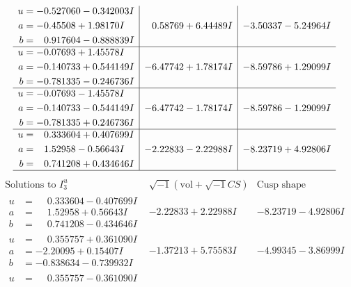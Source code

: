 \documentclass[1p]{elsarticle_modified}
\theoremstyle{definition}
\newcommand{\I}{\sqrt{-1}}
\begin{document}
$$\begin{array}{c|c|c}
\begin{aligned}
u &= -0.527060 - 0.342003 I \\
a &= -0.45508 + 1.98170 I \\
b &= \phantom{-}0.917604 - 0.888839 I\end{aligned}
 & \phantom{-}0.58769 + 6.44489 I & -3.50337 - 5.24964 I \\ \hline\begin{aligned}
u &= -0.07693 + 1.45578 I \\
a &= -0.140733 + 0.544149 I \\
b &= -0.781335 - 0.246736 I\end{aligned}
 & -6.47742 + 1.78174 I & -8.59786 + 1.29099 I \\ \hline\begin{aligned}
u &= -0.07693 - 1.45578 I \\
a &= -0.140733 - 0.544149 I \\
b &= -0.781335 + 0.246736 I\end{aligned}
 & -6.47742 - 1.78174 I & -8.59786 - 1.29099 I \\ \hline\begin{aligned}
u &= \phantom{-}0.333604 + 0.407699 I \\
a &= \phantom{-}1.52958 - 0.56643 I \\
b &= \phantom{-}0.741208 + 0.434646 I\end{aligned}
 & -2.22833 - 2.22988 I & -8.23719 + 4.92806 I\\
 \hline 
 \end{array}$$\newpage$$\begin{array}{c|c|c}  
\text{Solutions to }I^u_{3}& \I (\text{vol} + \sqrt{-1}CS) & \text{Cusp shape}\\
 \hline 
\begin{aligned}
u &= \phantom{-}0.333604 - 0.407699 I \\
a &= \phantom{-}1.52958 + 0.56643 I \\
b &= \phantom{-}0.741208 - 0.434646 I\end{aligned}
 & -2.22833 + 2.22988 I & -8.23719 - 4.92806 I \\ \hline\begin{aligned}
u &= \phantom{-}0.355757 + 0.361090 I \\
a &= -2.20095 + 0.15407 I \\
b &= -0.838634 - 0.739932 I\end{aligned}
 & -1.37213 + 5.75583 I & -4.99345 - 3.86999 I \\ \hline\begin{aligned}
u &= \phantom{-}0.355757 - 0.361090 I \\

\end{aligned}
\end{array}$$
\end{document}
